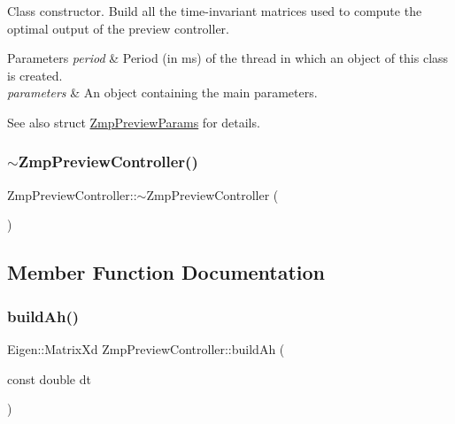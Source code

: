 Class constructor. Build all the time-\/invariant matrices used to compute the optimal output of the preview controller. 
\begin{DoxyParams}{Parameters}
{\em period} & Period (in ms) of the thread in which an object of this class is created. \\
\hline
{\em parameters} & An object containing the main parameters. \\
\hline
\end{DoxyParams}
\begin{DoxySeeAlso}{See also}
struct \hyperlink{structZmpPreviewParams}{Zmp\+Preview\+Params} for details. 
\end{DoxySeeAlso}
\hypertarget{classZmpPreviewController_af702c45f318c7a78310d19cc061886dd}{}\label{classZmpPreviewController_af702c45f318c7a78310d19cc061886dd} 
\subsubsection{\texorpdfstring{$\sim$\+Zmp\+Preview\+Controller()}{~ZmpPreviewController()}}
{\footnotesize\ttfamily Zmp\+Preview\+Controller\+::$\sim$\+Zmp\+Preview\+Controller (\begin{DoxyParamCaption}{ }\end{DoxyParamCaption})\hspace{0.3cm}{\ttfamily [virtual]}}



\subsection{Member Function Documentation}
\hypertarget{classZmpPreviewController_a39ffdba07960f90a6cce247065f12504}{}\label{classZmpPreviewController_a39ffdba07960f90a6cce247065f12504} 
\subsubsection{\texorpdfstring{build\+Ah()}{buildAh()}}
{\footnotesize\ttfamily Eigen\+::\+Matrix\+Xd Zmp\+Preview\+Controller\+::build\+Ah (\begin{DoxyParamCaption}\item[{const double}]{dt }\end{DoxyParamCaption})}

